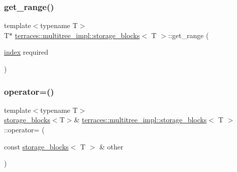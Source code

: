 \mbox{\label{classterraces_1_1multitree__impl_1_1storage__blocks_a3d970b6bbbf72c574f600c976a54b879}} 
\subsubsection{\texorpdfstring{get\+\_\+range()}{get\_range()}}
{\footnotesize\ttfamily template$<$typename T$>$ \\
T$\ast$ \hyperlink{classterraces_1_1multitree__impl_1_1storage__blocks}{terraces\+::multitree\+\_\+impl\+::storage\+\_\+blocks}$<$ T $>$\+::get\+\_\+range (\begin{DoxyParamCaption}\item[{\hyperlink{namespaceterraces_adbc33ccb543d1634e96d0eb02e472c77}{index}}]{required }\end{DoxyParamCaption})\hspace{0.3cm}{\ttfamily [inline]}}

\mbox{\label{classterraces_1_1multitree__impl_1_1storage__blocks_a8bbf444efc64e3b58d59c54e88efdc0e}} 
\subsubsection{\texorpdfstring{operator=()}{operator=()}\hspace{0.1cm}{\footnotesize\ttfamily [1/2]}}
{\footnotesize\ttfamily template$<$typename T$>$ \\
\hyperlink{classterraces_1_1multitree__impl_1_1storage__blocks}{storage\+\_\+blocks}$<$T$>$\& \hyperlink{classterraces_1_1multitree__impl_1_1storage__blocks}{terraces\+::multitree\+\_\+impl\+::storage\+\_\+blocks}$<$ T $>$\+::operator= (\begin{DoxyParamCaption}\item[{const \hyperlink{classterraces_1_1multitree__impl_1_1storage__blocks}{storage\+\_\+blocks}$<$ T $>$ \&}]{other }\end{DoxyParamCaption})\hspace{0.3cm}{\ttfamily [inline]}}


